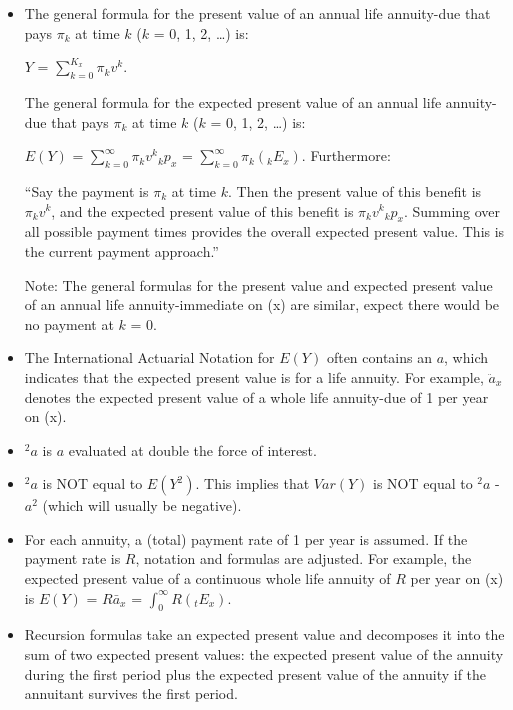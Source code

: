\documentclass[]{book}
\begin{document}
\begin{itemize}
\item
  The general formula for the present value of an annual life
  annuity-due that pays \(\pi_{k}\) at time \(k\) (\(k\) = 0, 1, 2,
  \ldots{}) is:

  \(Y\) = \(\sum^{K_x}_{k = 0} \pi_{k} v^{k}\).

  The general formula for the expected present value of an annual life
  annuity-due that pays \(\pi_{k}\) at time \(k\) (\(k\) = 0, 1, 2,
  \ldots{}) is:

  \(E(Y)\) = \(\sum^{\infty}_{k = 0} \pi_{k} v^{k}{}_{k}p_x\) =
  \(\sum^{\infty}_{k = 0} \pi_{k} ({}_{k}E_x)\). Furthermore:

  ``Say the payment is \(\pi_k\) at time \(k\). Then the present value
  of this benefit is \(\pi_{k} v^{k}\), and the expected present value
  of this benefit is \(\pi_{k} v^{k}{}_{k}p_x\). Summing over all
  possible payment times provides the overall expected present value.
  This is the current payment approach.''

  Note: The general formulas for the present value and expected present
  value of an annual life annuity-immediate on (x) are similar, expect
  there would be no payment at \(k\) = 0.
\item
  The International Actuarial Notation for \(E(Y)\) often contains an
  \(a\), which indicates that the expected present value is for a life
  annuity. For example, \(\ddot{a}_x\) denotes the expected present
  value of a whole life annuity-due of 1 per year on (x).
\item
  \(^2a\) is \(a\) evaluated at double the force of interest.
\item
  \(^2a\) is NOT equal to \(E(Y^2)\). This implies that \(Var(Y)\) is
  NOT equal to \(^2a\) - \(a^2\) (which will usually be negative).
\item
  For each annuity, a (total) payment rate of 1 per year is assumed. If
  the payment rate is \(R\), notation and formulas are adjusted. For
  example, the expected present value of a continuous whole life annuity
  of \(R\) per year on (x) is \(E(Y)\) = \(R\bar{a}_{x}\) =
  \(\int^{\infty}_0 R({}_{t}E_x)\).
\item
  Recursion formulas take an expected present value and decomposes it
  into the sum of two expected present values: the expected present
  value of the annuity during the first period plus the expected present
  value of the annuity if the annuitant survives the first period.


\end{itemize}
\end{document}
